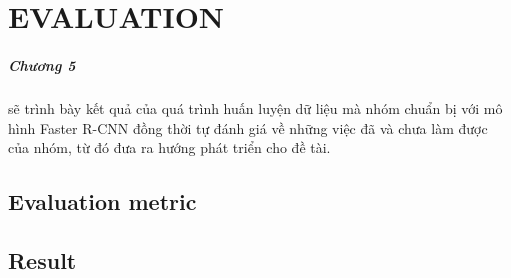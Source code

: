 \chapter{EVALUATION}
\label{conclusion}
\paragraph{Chương 5} sẽ trình bày kết quả của quá trình huấn luyện dữ liệu mà nhóm chuẩn bị với mô hình Faster R-CNN đồng thời tự đánh giá về những việc đã và chưa làm được của nhóm, từ đó đưa ra hướng phát triển cho đề tài.

\section{Evaluation metric}
\section{Result}

